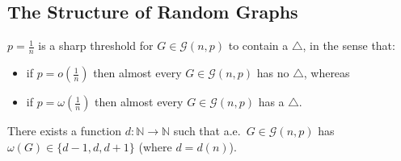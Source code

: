 \documentclass{article}
\begin{document}
\subsection{The Structure of Random Graphs}






































































\begin{nprop}\label{prop:40}
    $p = \frac{1}{n}$ is a sharp threshold for $G \in \mathcal{G}(n,p)$ to contain a $\triangle$, in the sense that:
    \begin{itemize}
        \item if $p = o(\frac{1}{n})$ then almost every $G \in \mathcal{G}(n,p)$ has no $\triangle$, whereas
        \item if $p = \omega(\frac{1}{n})$ then almost every $G \in \mathcal{G}(n,p)$ has a $\triangle$.
    \end{itemize}
\end{nprop}





\begin{nthm}\label{thm:41}
    There exists a function $d: \mathbb{N} \to \mathbb{N}$ such that a.e.\ $G \in \mathcal{G}(n,p)$ has $\omega(G) \in \{d-1,d,d+1\}$ (where $d = d(n)$).
\end{nthm}
\end{document}
